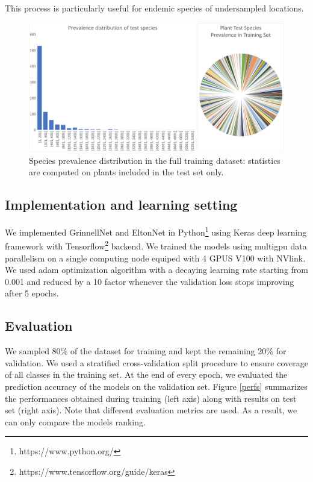 \documentclass[]{article}
\begin{document}
\noindent This process is particularly useful for endemic species of undersampled locations.   

\begin{figure}[h]
	\centering
	\includegraphics[scale=0.5]{classcardinality}
	\caption{Species prevalence distribution in the full training dataset: statistics are computed on plants included in the test set only.}
	\label{classcardinality}
\end{figure}

\subsection{Implementation and learning setting}
\noindent We implemented GrinnellNet and EltonNet in Python\footnote{https://www.python.org/} using Keras deep learning framework with Tensorflow\footnote{https://www.tensorflow.org/guide/keras} backend. We trained the models using multigpu data parallelism on a single computing node equiped with 4 GPUS V100 with NVlink. We used adam\cite{kingma2014adam} optimization algorithm with a decaying learning rate starting from 0.001 and reduced by a 10 factor whenever the validation loss stops improving after 5 epochs. \\ 

\subsection{Evaluation}
\noindent We sampled 80\% of the dataset for training and kept the remaining 20\% for validation. We used a stratified cross-validation split procedure to ensure coverage of all classes in the training set. At the end of every epoch, we evaluated the prediction accuracy of the models on the validation set. Figure \ref{perfs} summarizes the performances obtained during training (left axis) along with results on test set (right axis). Note that different evaluation metrics are used. As a result, we can only compare the models ranking.\\
\end{document}
